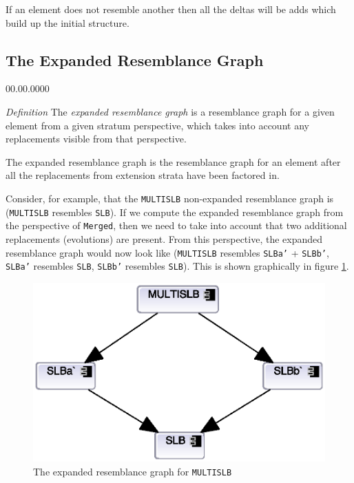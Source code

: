 If an element does not resemble another then all the deltas will be
adds which build up the initial structure.


\subsection{The Expanded Resemblance Graph}
\begin{lyxlist}{00.00.0000}
\item [{\emph{Definition}}] The \emph{expanded resemblance graph} is a
resemblance graph for a given element from a given stratum perspective,
which takes into account any replacements visible from that perspective.
\end{lyxlist}
The expanded resemblance graph is the resemblance graph for an element
after all the replacements from extension strata have been factored
in.

Consider, for example, that the \texttt{MULTISLB} non-expanded resemblance
graph is (\texttt{MULTISLB} resembles \texttt{SLB}). If we compute
the expanded resemblance graph from the perspective of \texttt{Merged},
then we need to take into account that two additional replacements
(evolutions) are present. From this perspective, the expanded resemblance
graph would now look like (\texttt{MULTISLB} resembles \texttt{SLBa\textquoteright{}}
+ \texttt{SLBb\textquoteright }, \texttt{SLBa\textquoteright{}} resembles
\texttt{SLB}, \texttt{SLBb\textquoteright{}} resembles \texttt{SLB}).
This is shown graphically in figure \ref{fig:The-expanded-resemblance}.

\begin{figure}[h]
\noindent \begin{centering}
\includegraphics[width=0.6\columnwidth]{images/formal-expanded}
\par\end{centering}

\protect\caption{\label{fig:The-expanded-resemblance}The expanded resemblance graph
for \texttt{MULTISLB}}


\end{figure}


